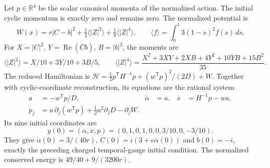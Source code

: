 Let \(p\in\mathbb R^4\) be the scalar canonical momenta of the normalized
action. The initial cyclic momentum is exactly zero and remains zero. The
normalized potential is
\[
 W(x)=r|C-b|^2+\tfrac12\langle|Z|^2\rangle
                         +\tfrac18\langle|Z|^4\rangle,
 \qquad \langle f\rangle=\int_0^1 3(1-s)^2f(s)\,ds.
\]
For \(X=|C|^2\), \(Y=\operatorname{Re}(\overline Cb)\), \(B=|b|^2\),
the moments are
\[
 \langle|Z|^2\rangle=X/10+3Y/10+3B/5,
 \qquad
 \langle|Z|^4\rangle=
 \frac{X^2+3XY+2XB+4Y^2+10YB+15B^2}{35}.
\]
The reduced Hamiltonian is
\(\mathcal H=\tfrac12p^{\mathsf T}H^{-1}p+
(w^{\mathsf T}p)^2/(2D)+W\).
Together with cyclic-coordinate reconstruction, its equations are the
rational system
\begin{align}
 a&=-w^{\mathsf T}p/D,&
 \dot\alpha&=a,&\dot x&=H^{-1}p-wa,\nonumber\\
 \dot p_j&=a\,\partial_j(w^{\mathsf T}p)
               +\tfrac12a^2\partial_jD-\partial_jW.
 \label{eq:whitney-charged-rational-ode}
\end{align}
Its nine initial coordinates are
\[
 y(0)=(\alpha,x,p)=(0,1,0,1,0,0,3/10,0,-3/10).
\]
They give \(\dot\alpha(0)=3/(40r)\),
\(\dot C(0)=i(3+e\dot\alpha(0))\) and \(\dot b(0)=-i\),
exactly the preceding charged temporal-gauge initial condition. The
normalized conserved energy is \(49/40+9/(3200r)\).


